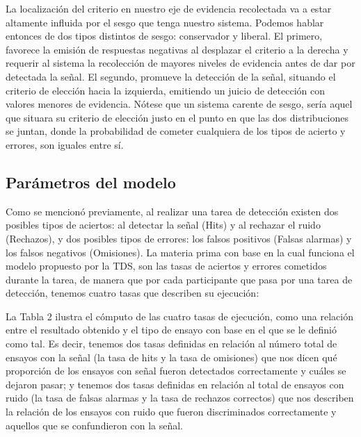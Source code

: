 \begin{itemize}
\begin{itemize}
La localización del criterio en nuestro eje de evidencia recolectada va a estar altamente influida por el sesgo que tenga nuestro sistema. Podemos hablar entonces de dos tipos distintos de sesgo: conservador y liberal. El primero, favorece la emisión de respuestas negativas al desplazar el criterio a la derecha y requerir al sistema la recolección de mayores niveles de evidencia antes de dar por detectada la señal. El segundo, promueve la detección de la señal, situando el criterio de elección hacia la izquierda, emitiendo un juicio de detección con valores menores de evidencia. Nótese que un sistema carente de sesgo, sería aquel que situara su criterio de elección justo en el punto en que las dos distribuciones se juntan, donde la probabilidad de cometer cualquiera de los tipos de acierto y errores, son iguales entre sí.\\

     \end{itemize}
\end{itemize}

\subsection{Parámetros del modelo}

Como se mencionó previamente, al realizar una tarea de detección existen dos posibles tipos de aciertos: al detectar la señal (Hits) y al rechazar el ruido (Rechazos), y dos posibles tipos de errores: los falsos positivos (Falsas alarmas) y los falsos negativos (Omisiones). La materia prima con base en la cual funciona el modelo propuesto por la TDS, son las tasas de aciertos y errores cometidos durante la tarea, de manera que por cada participante que pasa por una tarea de detección, tenemos cuatro tasas que describen su ejecución:

La Tabla 2 ilustra el cómputo de las cuatro tasas de ejecución, como una relación entre el resultado obtenido y el tipo de ensayo con base en el que se le definió como tal. Es decir, tenemos dos tasas definidas en relación al número total de ensayos con la señal (la tasa de hits y la tasa de omisiones) que nos dicen qué proporción de los ensayos con señal fueron detectados correctamente y cuáles se dejaron pasar; y tenemos dos tasas definidas en relación al total de ensayos con ruido (la tasa de falsas alarmas y la tasa de rechazos correctos) que nos describen la relación de los ensayos con ruido que fueron discriminados correctamente y aquellos que se confundieron con la señal.

